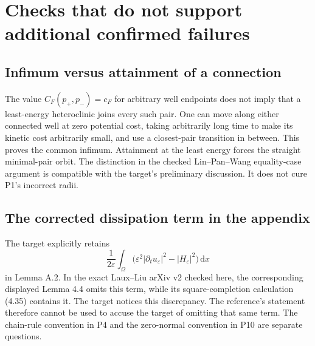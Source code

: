 \documentclass[10pt]{article}
\begin{document}
\section*{Checks that do not support additional confirmed failures}
\subsection*{Infimum versus attainment of a connection}
The value \(C_F(p_+,p_-)=c_F\) for arbitrary well endpoints does not imply that a least-energy heteroclinic joins every such pair. One can move along either connected well at zero potential cost, taking arbitrarily long time to make its kinetic cost arbitrarily small, and use a closest-pair transition in between. This proves the common infimum. Attainment at the least energy forces the straight minimal-pair orbit. The distinction in the checked Lin–Pan–Wang equality-case argument is compatible with the target’s preliminary discussion. It does not cure P1’s incorrect radii.\par
\subsection*{The corrected dissipation term in the appendix}
The target explicitly retains \[\frac1{2\varepsilon}\int_\Omega
       \bigl(\varepsilon^2|\partial_tu_\varepsilon|^2-|H_\varepsilon|^2\bigr)\,\mathrm dx\] in Lemma A.2. In the exact Laux–Liu arXiv v2 checked here, the corresponding displayed Lemma 4.4 omits this term, while its square-completion calculation (4.35) contains it. The target notices this discrepancy. The reference’s statement therefore cannot be used to accuse the target of omitting that same term. The chain-rule convention in P4 and the zero-normal convention in P10 are separate questions.\par
\end{document}
